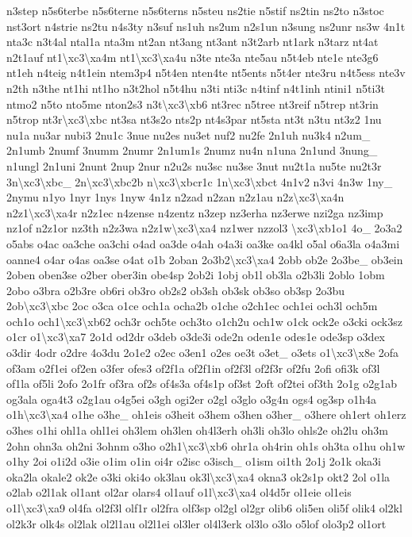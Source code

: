 \begin{DoxyCompactItemize}
n3step n5s6terbe n5s6terne n5s6terns n5steu ns2tie n5stif ns2tin ns2to n3stoc nst3ort n4strie ns2tu n4s3ty n3suf ns1uh ns2um n2s1un n3sung ns2unr ns3w 4n1t nta3c n3t4al ntal1a nta3m nt2an nt3ang nt3ant n3t2arb nt1ark n3tarz nt4at n2t1auf nt1\textbackslash{}xc3\textbackslash{}xa4m nt1\textbackslash{}xc3\textbackslash{}xa4u n3te nte3a nte5au n5t4eb nte1e nte3g6 nt1eh n4teig n4t1ein ntem3p4 n5t4en nten4te nt5ents n5t4er nte3ru n4t5ess nte3v n2th n3the nt1hi nt1ho n3t2hol n5t4hu n3ti nti3c n4tinf n4t1inh ntini1 n5ti3t ntmo2 n5to nto5me nton2s3 n3t\textbackslash{}xc3\textbackslash{}xb6 nt3rec n5tree nt3reif n5trep nt3rin n5trop nt3r\textbackslash{}xc3\textbackslash{}xbc nt3sa nt3s2o nts2p nt4s3par nt5sta nt3t n3tu nt3z2 1nu nu1a nu3ar nubi3 2nu1c 3nue nu2es nu3et nuf2 nu2fe 2n1uh nu3k4 n2um\-\_\- 2n1umb 2numf 3numm 2numr 2n1um1s 2numz nu4n n1una 2n1und 3nung\-\_\- n1ungl 2n1uni 2nunt 2nup 2nur n2u2s nu3sc nu3se 3nut nu2t1a nu5te nu2t3r 3n\textbackslash{}xc3\textbackslash{}xbc\-\_\- 2n\textbackslash{}xc3\textbackslash{}xbc2b n\textbackslash{}xc3\textbackslash{}xbcr1c 1n\textbackslash{}xc3\textbackslash{}xbct 4n1v2 n3vi 4n3w 1ny\-\_\- 2nymu n1yo 1nyr 1nys 1nyw 4n1z n2zad n2zan n2z1au n2z\textbackslash{}xc3\textbackslash{}xa4n n2z1\textbackslash{}xc3\textbackslash{}xa4r n2z1ec n4zense n4zentz n3zep nz3erha nz3erwe nzi2ga nz3imp nz1of n2z1or nz3th n2z3wa n2z1w\textbackslash{}xc3\textbackslash{}xa4 nz1wer nzzol3 \textbackslash{}xc3\textbackslash{}xb1o1 4o\-\_\- 2o3a2 o5abs o4ac oa3che oa3chi o4ad oa3de o4ah o4a3i oa3ke oa4kl o5al o6a3la o4a3mi oanne4 o4ar o4as oa3se o4at o1b 2oban 2o3b2\textbackslash{}xc3\textbackslash{}xa4 2obb ob2e 2o3be\-\_\- ob3ein 2oben oben3se o2ber ober3in obe4sp 2ob2i 1obj ob1l ob3la o2b3li 2oblo 1obm 2obo o3bra o2b3re ob6ri ob3ro ob2s2 ob3sh ob3sk ob3so ob3sp 2o3bu 2ob\textbackslash{}xc3\textbackslash{}xbc 2oc o3ca o1ce och1a ocha2b o1che o2ch1ec och1ei och3l och5m och1o och1\textbackslash{}xc3\textbackslash{}xb62 och3r och5te och3to o1ch2u och1w o1ck ock2e o3cki ock3sz o1cr o1\textbackslash{}xc3\textbackslash{}xa7 2o1d od2dr o3deb o3de3i ode2n oden1e odes1e ode3sp o3dex o3dir 4odr o2dre 4o3du 2o1e2 o2ec o3en1 o2es oe3t o3et\-\_\- o3ets o1\textbackslash{}xc3\textbackslash{}x8e 2ofa of3am o2f1ei of2en o3fer ofes3 of2f1a of2f1in of2f3l of2f3r of2fu 2ofi ofi3k of3l of1la of5li 2ofo 2o1fr of3ra of2s of4s3a of4s1p of3st 2oft of2tei of3th 2o1g o2g1ab og3ala oga4t3 o2g1au o4g5ei o3gh ogi2er o2gl o3glo o3g4n ogs4 og3sp o1h4a o1h\textbackslash{}xc3\textbackslash{}xa4 o1he o3he\-\_\- oh1eis o3heit o3hem o3hen o3her\-\_\- o3here oh1ert oh1erz o3hes o1hi ohl1a ohl1ei oh3lem oh3len oh4l3erh oh3li oh3lo ohls2e oh2lu oh3m 2ohn ohn3a oh2ni 3ohnm o3ho o2h1\textbackslash{}xc3\textbackslash{}xb6 ohr1a oh4rin oh1s oh3ta o1hu oh1w o1hy 2oi o1i2d o3ie o1im o1in oi4r o2isc o3isch\-\_\- o1ism oi1th 2o1j 2o1k oka3i oka2la okale2 ok2e o3ki oki4o ok3lau ok3l\textbackslash{}xc3\textbackslash{}xa4 okna3 ok2s1p okt2 2ol o1la o2lab o2l1ak ol1ant ol2ar olars4 ol1auf o1l\textbackslash{}xc3\textbackslash{}xa4 ol4d5r ol1eie ol1eis o1l\textbackslash{}xc3\textbackslash{}xa9 ol4fa ol2f3l olf1r ol2fra olf3sp ol2gl ol2gr olib6 oli5en oli5f olik4 ol2kl ol2k3r olk4s ol2lak ol2l1au ol2l1ei ol3ler ol4l3erk ol3lo o3lo o5lof olo3p2 ol1ort 
\end{DoxyCompactItemize}
